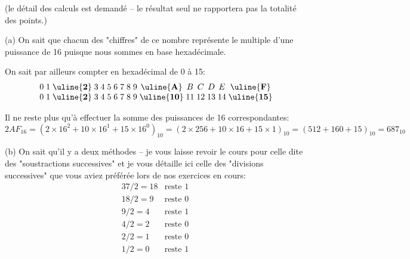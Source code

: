 \documentclass[11pt,a4paper]{exam}
\begin{document}
\begin{questions}
\begin{spacing}{1}
		 (le détail des calculs est demandé -- le résultat seul ne rapportera pas la totalité des points.)
	           	\begin{solution}
	           		
	           		(a) On sait que chacun des "chiffres" de ce nombre représente le multiple d'une puissance de 16 puisque nous sommes en base hexadécimale.
	           		
	           		On sait par ailleurs compter en hexadécimal de 0 à 15:
	           		\[
	           		\begin{array}{r *{16}{@{\;}c}}
	           			0 & 1 & \uline{\textbf{2}} & 3 & 4 & 5 & 6 & 7 & 8 & 9 & \uline{\textbf{A}} & B & C & D & E & \uline{\textbf{F}} \\
	           			0 & 1 & \uline{\textbf{2}} & 3 & 4 & 5 & 6 & 7 & 8 & 9 & \uline{\textbf{10}} & 11 & 12 & 13 & 14 & \uline{\textbf{15}} \\
	           		\end{array}
	           		\]
	           		
	           		Il ne reste plus qu'à effectuer la somme des puissances de 16 correspondantes:
	           		\[
	           		2AF_{16} = (2 \times 16^2 + 10 \times 16^1 + 15 \times 16^0)_{10} = (2 \times 256 + 10 \times 16 + 15 \times 1)_{10} = (512 + 160 + 15)_{10} = 687_{10}
	           		\]
	           		
	           		
	           		
					(b) On sait qu'il y a deux méthodes -- je vous laisse revoir le cours pour celle dite des "soustractions successives" et je vous détaille ici celle des "divisions successives" que vous aviez préférée lors de nos exercices en cours:
					\[
					\begin{array}{ll}
						37 / 2 = 18 & \text{reste } 1 \\
						18 / 2 = 9 & \text{reste } 0 \\
						9 / 2 = 4 & \text{reste } 1 \\
						4 / 2 = 2 & \text{reste } 0 \\
						2 / 2 = 1 & \text{reste } 0 \\
						1 / 2 = 0 & \text{reste } 1 \\
					\end{array}
					\]
					

\end{solution}
\end{spacing}
\end{questions}
\end{document}
